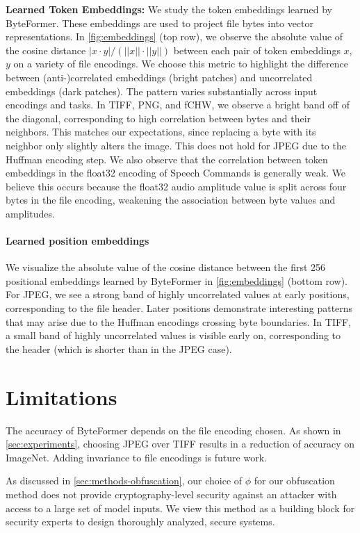 \textbf{Learned Token Embeddings:} We study the token embeddings learned by ByteFormer. These embeddings are used to project file bytes into vector representations. In \autoref{fig:embeddings} (top row), we observe the absolute value of the cosine distance $|x \cdot y |/ (||x|| \cdot ||y||)$ between each pair of token embeddings $x$, $y$ on a variety of file encodings. We choose this metric to highlight the difference between (anti-)correlated embeddings (bright patches) and uncorrelated embeddings (dark patches). The pattern varies substantially across input encodings and tasks. In TIFF, PNG, and fCHW, we observe a bright band off of the diagonal, corresponding to high correlation between bytes and their neighbors. This matches our expectations, since replacing a byte with its neighbor only slightly alters the image. This does not hold for JPEG due to the Huffman encoding step. We also observe that the correlation between token embeddings in the float32 encoding of Speech Commands is generally weak. We believe this occurs because the float32 audio amplitude value is split across four bytes in the file encoding, weakening the association between byte values and amplitudes.

\paragraph{Learned position embeddings} We visualize the absolute value of the cosine distance between the first 256 positional embeddings learned by ByteFormer in \autoref{fig:embeddings} (bottom row). For JPEG, we see a strong band of highly uncorrelated values at early positions, corresponding to the file header. Later positions demonstrate interesting patterns that may arise due to the Huffman encodings crossing byte boundaries. In TIFF, a small band of highly uncorrelated values is visible early on, corresponding to the header (which is shorter than in the JPEG case).

\section{Limitations}
The accuracy of ByteFormer depends on the file encoding chosen. As shown in \autoref{sec:experiments}, choosing JPEG over TIFF results in a reduction of accuracy on ImageNet. Adding invariance to file encodings is future work.

As discussed in \autoref{sec:methods-obfuscation}, our choice of $\phi$ for our obfuscation method does not provide cryptography-level security against an attacker with access to a large set of model inputs. We view this method as a building block for security experts to design thoroughly analyzed, secure systems.

